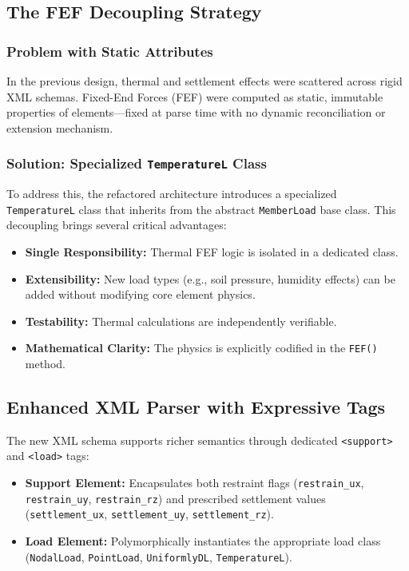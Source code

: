 \documentclass[12pt,a4paper]{article}
\begin{document}
\subsection{The FEF Decoupling Strategy}

\subsubsection{Problem with Static Attributes}

In the previous design, thermal and settlement effects were scattered across rigid XML schemas. Fixed-End Forces (FEF) were computed as static, immutable properties of elements---fixed at parse time with no dynamic reconciliation or extension mechanism.

\subsubsection{Solution: Specialized \texttt{TemperatureL} Class}

To address this, the refactored architecture introduces a specialized \texttt{TemperatureL} class that inherits from the abstract \texttt{MemberLoad} base class. This decoupling brings several critical advantages:

\begin{itemize}
    \item \textbf{Single Responsibility:} Thermal FEF logic is isolated in a dedicated class.
    \item \textbf{Extensibility:} New load types (e.g., soil pressure, humidity effects) can be added without modifying core element physics.
    \item \textbf{Testability:} Thermal calculations are independently verifiable.
    \item \textbf{Mathematical Clarity:} The physics is explicitly codified in the \texttt{FEF()} method.
\end{itemize}

\subsection{Enhanced XML Parser with Expressive Tags}

The new XML schema supports richer semantics through dedicated \texttt{<support>} and \texttt{<load>} tags:

\begin{itemize}
    \item \textbf{Support Element:} Encapsulates both restraint flags (\texttt{restrain\_ux}, \texttt{restrain\_uy}, \texttt{restrain\_rz}) and prescribed settlement values (\texttt{settlement\_ux}, \texttt{settlement\_uy}, \texttt{settlement\_rz}).
    \item \textbf{Load Element:} Polymorphically instantiates the appropriate load class (\texttt{NodalLoad}, \texttt{PointLoad}, \texttt{UniformlyDL}, \texttt{TemperatureL}).
\end{itemize}
\end{document}
